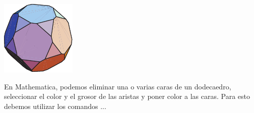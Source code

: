 \documentclass{article}
\begin{document}
\parbox{3cm}{ \includegraphics{images/fig4}} \parbox{11.5cm}{ En
	{\sc Mathematica}, podemos eliminar una o varias caras de un dodecaedro,
	seleccionar el color y el grosor de las aristas y poner color a las caras.
	Para esto debemos utilizar los comandos ... }
\end{document}

